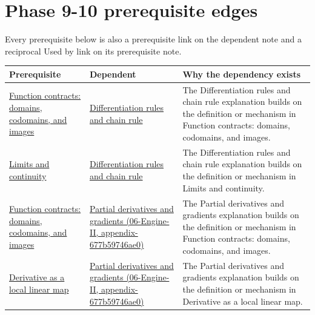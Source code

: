 \section{Phase 9-10 prerequisite edges}\label{appendix-4ad47bdd269a-phase-9-10-prerequisite-edges}

Every prerequisite below is also a prerequisite link on the dependent note and a reciprocal Used by link on its prerequisite note.

{\def\LTcaptype{none} %
\begin{longtable}[]{@{}
  >{\raggedright\arraybackslash}p{}
  >{\raggedright\arraybackslash}p{}
  >{\raggedright\arraybackslash}p{}@{}}
\toprule\noalign{}
\begin{minipage}[b]{\linewidth}\raggedright
Prerequisite
\end{minipage} & \begin{minipage}[b]{\linewidth}\raggedright
Dependent
\end{minipage} & \begin{minipage}[b]{\linewidth}\raggedright
Why the dependency exists
\end{minipage} \\
\midrule\noalign{}
\endhead
\bottomrule\noalign{}
\endlastfoot
\hyperref[appendix-a59658325cd6]{Function contracts: domains, codomains, and images} & \hyperref[appendix-d9f70bdfbc92]{Differentiation rules and chain rule} & The Differentiation rules and chain rule explanation builds on the definition or mechanism in Function contracts: domains, codomains, and images. \\
\hyperref[appendix-fecc1847f5a3]{Limits and continuity} & \hyperref[appendix-d9f70bdfbc92]{Differentiation rules and chain rule} & The Differentiation rules and chain rule explanation builds on the definition or mechanism in Limits and continuity. \\
\hyperref[appendix-a59658325cd6]{Function contracts: domains, codomains, and images} & \href{../06-Engine-II/main.pdf\#nameddest=appendix-677b59746ae0}{Partial derivatives and gradients (06-Engine-II, appendix-677b59746ae0)} & The Partial derivatives and gradients explanation builds on the definition or mechanism in Function contracts: domains, codomains, and images. \\
\hyperref[appendix-7bc181935c42]{Derivative as a local linear map} & \href{../06-Engine-II/main.pdf\#nameddest=appendix-677b59746ae0}{Partial derivatives and gradients (06-Engine-II, appendix-677b59746ae0)} & The Partial derivatives and gradients explanation builds on the definition or mechanism in Derivative as a local linear map. \\

\end{longtable}}
